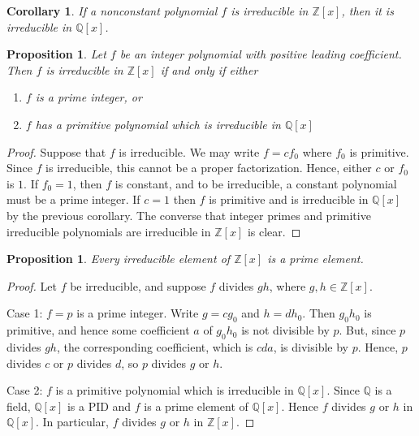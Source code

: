 \documentclass[12pt]{article}
\newtheorem{cor}[thm]{Corollary}
\newtheorem{prop}[thm]{Proposition}
\theoremstyle{definition}
\theoremstyle{remark}
\numberwithin{equation}{section}
\newcommand\Z{\mathbb Z}    %
\newcommand\Q{\mathbb Q}    %
\begin{document}
\vspace{15pt}

\begin{cor}
        If a nonconstant polynomial $f$ is irreducible in $\Z[x]$, then it is irreducible in $\Q[x]$.
\end{cor}

\vspace{15pt}

\begin{prop}
        Let $f$ be an integer polynomial with positive leading coefficient. Then $f$ is irreducible in $\Z[x]$ if and only if either \begin{enumerate}
                \item $f$ is a prime integer, or
                \item $f$ has a primitive polynomial which is irreducible in $\Q[x]$
        \end{enumerate}
\end{prop}

\begin{proof}
        Suppose that $f$ is irreducible. We may write $f = cf_0$ where $f_0$ is primitive. Since $f$ is irreducible, this cannot be a proper factorization. Hence, either $c$ or $f_0$ is $1$. If $f_0 =1$, then $f$ is constant, and to be irreducible, a constant polynomial must be a prime integer. If $c = 1$ then $f$ is primitive and is irreducible in $\Q[x]$ by the previous corollary. The converse that integer primes and primitive irreducible polynomials are irreducible in $\Z[x]$ is clear.
\end{proof}

\vspace{15pt}

\begin{prop}
        Every irreducible element of $\Z[x]$ is a prime element. 
\end{prop}
\begin{proof}
        Let $f$ be irreducible, and suppose $f$ divides $gh$, where $g,h \in \Z[x]$.
        

        Case 1: $f = p$ is a prime integer. Write $g = cg_0$ and $h = dh_0$. Then $g_0h_0$ is primitive, and hence some coefficient $a$ of $g_0h_0$ is not divisible by $p$. But, since $p$ divides $gh$, the corresponding coefficient, which is $cda$, is divisible by $p$. Hence, $p$ divides $c$ or $p$ divides $d$, so $p$ divides $g$ or $h$.


        Case 2: $f$ is a primitive polynomial which is irreducible in $\Q[x]$. Since $\Q$ is a field, $\Q[x]$ is a PID and $f$ is a prime element of $\Q[x]$. Hence $f$ divides $g$ or $h$ in $\Q[x]$. In particular, $f$ divides $g$ or $h$ in $\Z[x]$.
\end{proof}
\end{document}
